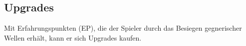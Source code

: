 \subsection{Upgrades}

%

Mit Erfahrungspunkten (EP), die der Spieler durch das Besiegen gegnerischer
Wellen erhält, kann er sich Upgrades kaufen.

